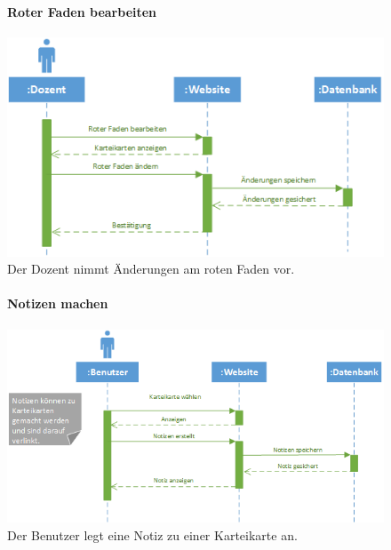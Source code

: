 \documentclass[12pt,a4paper]{article}
\begin{document}
\begin{figure}[H]
	\centering
	\paragraph{Roter Faden bearbeiten}
	\includegraphics[width=\textwidth]{Bilder/Sequenzdiagramme/RoterFadenBearbeiten.png}
	\caption{Der Dozent nimmt Änderungen am roten Faden vor.}
	\label{SzRoterFaden}
\end{figure}
\begin{figure}[H]
	\centering
	\paragraph{Notizen machen}
	\includegraphics[width=\textwidth]{Bilder/Sequenzdiagramme/NotizenMachen.png}
	\caption{Der Benutzer legt eine Notiz zu einer Karteikarte an.}
	\label{SzNotizenMachen}
\end{figure}
\end{document}
